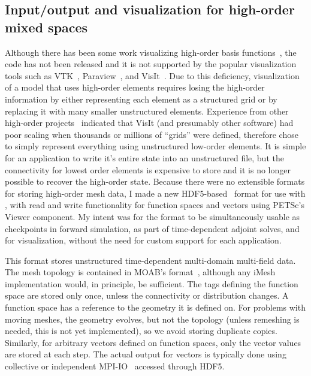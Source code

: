 \subsection{Input/output and visualization for high-order mixed spaces}
Although there has been some work visualizing high-order basis functions~\citep{schroeder2005framework,schroeder2006methods,ueffinger2010interactive}, the code has not been released and it is not supported by the popular visualization tools such as VTK~\citep{schroeder1998visualization}, Paraview~\citep{henderson2004paraview}, and VisIt~\citep{childs2006beyond}.
Due to this deficiency, visualization of a model that uses high-order elements requires losing the high-order information by either representing each element as a structured grid or by replacing it with many smaller unstructured elements.
Experience from other high-order projects~\citep{fischer2008nek5000} indicated that VisIt (and presumably other software) had poor scaling when thousands or millions of ``grids'' were defined, therefore {\Dohp} chose to simply represent everything using unstructured low-order elements.
It is simple for an application to write it's entire state into an unstructured file, but the connectivity for lowest order elements is expensive to store and it is no longer possible to recover the high-order state.
Because there were no extensible formats for storing high-order mesh data, I made a new HDF5-based~\citep{hdf5} format for use with {\Dohp}, with read and write functionality for function spaces and vectors using PETSc's Viewer component.
My intent was for the format to be simultaneously usable as checkpoints in forward simulation, as part of time-dependent adjoint solves, and for visualization, without the need for custom support for each application.

This format stores unstructured time-dependent multi-domain multi-field data.
The mesh topology is contained in MOAB's format~\citep{moab}, although any iMesh implementation would, in principle, be sufficient.
The tags defining the function space are stored only once, unless the connectivity or distribution changes.
A function space has a reference to the geometry it is defined on.
For problems with moving meshes, the geometry evolves, but not the topology (unless remeshing is needed, this is not yet implemented), so we avoid storing duplicate copies.
Similarly, for arbitrary vectors defined on function spaces, only the vector values are stored at each step.
The actual output for vectors is typically done using collective or independent MPI-IO~\citep{corbett1995overview} accessed through HDF5.


